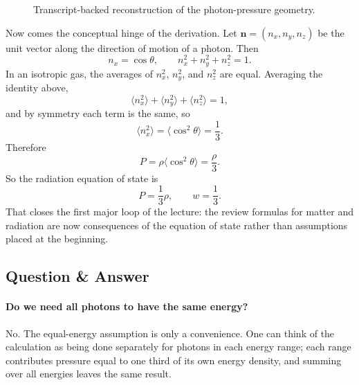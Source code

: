 \begin{figure}[h]
\centering
{}
\caption{Transcript-backed reconstruction of the photon-pressure geometry.}
\end{figure}

Now comes the conceptual hinge of the derivation. Let \(\mathbf n=(n_x,n_y,n_z)\) be the unit vector along the direction of motion of a photon. Then
\begin{equation}
n_x=\cos\theta,
\qquad
n_x^2+n_y^2+n_z^2=1.
\end{equation}
In an isotropic gas, the averages of \(n_x^2\), \(n_y^2\), and \(n_z^2\) are equal. Averaging the identity above,
\begin{equation}
\langle n_x^2\rangle+\langle n_y^2\rangle+\langle n_z^2\rangle=1,
\end{equation}
and by symmetry each term is the same, so
\begin{equation}
\langle n_x^2\rangle=\langle \cos^2\theta\rangle=\frac13.
\end{equation}
Therefore
\begin{equation}
P=\rho\langle \cos^2\theta\rangle=\frac{\rho}{3}.
\end{equation}
So the radiation equation of state is
\begin{equation}
P=\frac13\rho,
\qquad
w=\frac13.
\end{equation}
That closes the first major loop of the lecture: the review formulas for matter and radiation are now consequences of the equation of state rather than assumptions placed at the beginning.

\subsection{Question \& Answer}

\paragraph{Do we need all photons to have the same energy?} No. The equal-energy assumption is only a convenience. One can think of the calculation as being done separately for photons in each energy range; each range contributes pressure equal to one third of its own energy density, and summing over all energies leaves the same result.

